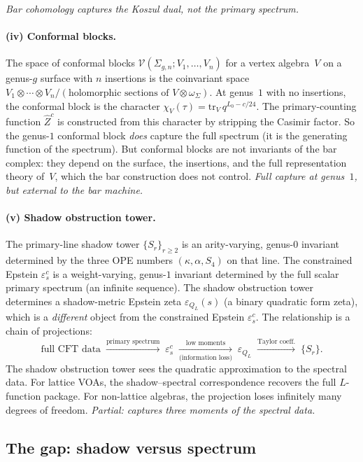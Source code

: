 \documentclass[11pt]{article}
\newcommand{\cV}{\mathcal{V}}
\begin{document}
\emph{Bar cohomology captures the Koszul dual, not the
primary spectrum.}

\paragraph{(iv) Conformal blocks.}
The space of conformal blocks
$\cV(\Sigma_{g,n}; V_1, \ldots, V_n)$ for a vertex
algebra~$V$ on a genus-$g$ surface with $n$ insertions is the
coinvariant space $V_1 \otimes \cdots \otimes V_n /
(\text{holomorphic sections of } V \otimes \omega_\Sigma)$.
At genus~$1$ with no insertions, the conformal block is the
character $\chi_V(\tau) = \mathrm{tr}_{V}\, q^{L_0 - c/24}$.
The primary-counting function $\hat Z^c$ is constructed from
this character by stripping the Casimir factor.  So the
genus-$1$ conformal block \emph{does} capture the full spectrum
(it is the generating function of the spectrum).  But conformal
blocks are not invariants of the bar complex: they depend on
the surface, the insertions, and the full representation theory
of~$V$, which the bar construction does not control.
\emph{Full capture at genus~$1$, but external to the bar
machine.}

\paragraph{(v) Shadow obstruction tower.}
The primary-line shadow tower $\{S_r\}_{r \geq 2}$ is an
arity-varying, genus-$0$ invariant determined by the three OPE
numbers $(\kappa, \alpha, S_4)$ on that line.  The constrained Epstein
$\varepsilon^c_s$ is a weight-varying, genus-$1$ invariant
determined by the full scalar primary spectrum (an infinite
sequence).  The shadow obstruction tower determines a shadow-metric
Epstein zeta $\varepsilon_{Q_L}(s)$ (a binary quadratic form
zeta), which is a \emph{different} object from the constrained
Epstein $\varepsilon^c_s$.  The relationship is a chain of
projections:
\[
\text{full CFT data}
\;\xrightarrow{\text{primary spectrum}}\;
\varepsilon^c_s
\;\xrightarrow[\text{(information loss)}]{\text{low moments}}\;
\varepsilon_{Q_L}
\;\xrightarrow{\text{Taylor coeff.}}\;
\{S_r\}.
\]
The shadow obstruction tower sees the quadratic approximation to the spectral
data.  For lattice VOAs, the shadow--spectral correspondence
recovers the full $L$-function package.  For non-lattice
algebras, the projection loses infinitely many degrees of
freedom.  \emph{Partial: captures three moments of the spectral
data.}

\subsection{The gap: shadow versus spectrum}
\end{document}
